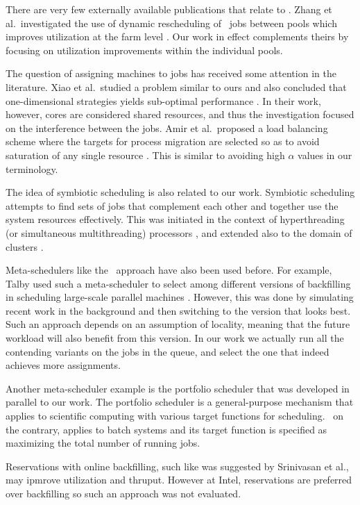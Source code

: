 There are very few externally available publications that relate to \nb.
Zhang et al.\ investigated the use of dynamic rescheduling of
\nb\ jobs between pools which improves utilization at the farm level
\cite{Zhang2010}.
Our work in effect complements theirs by focusing on utilization
improvements within the individual pools.

The question of assigning machines to jobs has received some attention
in the literature.
Xiao et al.\ studied a problem similar to ours and also concluded that
one-dimensional strategies yields sub-optimal performance
\cite{Xiao02dynamiccluster}.
In their work, however, cores are considered shared resources, and
thus the investigation focused on the interference between the jobs.
Amir et al.\ proposed a load balancing scheme where the targets for
process migration are selected so as to avoid saturation of any single
resource \cite{amir00}.
This is similar to avoiding high $\alpha$ values in our terminology.

The idea of symbiotic scheduling is also related to our work.
Symbiotic scheduling attempts to find sets of jobs that complement
each other and together use the system resources effectively.
This was initiated in the context of hyperthreading (or simultaneous
multithreading) processors \cite{snavely00,eyerman10},
and extended also to the domain of clusters \cite{weinberg06}.

Meta-schedulers like the \maj\ approach have also been used before.
For example, Talby used such a meta-scheduler to select among different
versions of backfilling in scheduling large-scale parallel machines
\cite{talby05}.
However, this was done by simulating recent work in the background and
then switching to the version that looks best.
Such an approach depends on an assumption of locality, meaning that
the future workload will also benefit from this version.
In our work we actually run all the contending variants on the jobs in
the queue, and select the one that indeed achieves more assignments.

Another meta-scheduler example is the portfolio scheduler
\cite{Deng1305Protfolio} that was developed in parallel to our work. The
portfolio scheduler is a general-purpose mechanism that applies
to scientific computing with various target functions for scheduling. \maj\ on
the contrary, applies to batch systems and its target function is specified as
maximizing the total number of running jobs.

Reservations with online backfilling, such like was suggested by 
Srinivasan et al.\cite{Srinivasan2002}, may ipmrove utilization and thruput.
However at Intel, reservations are preferred over backfilling so such an approach was not evaluated.

